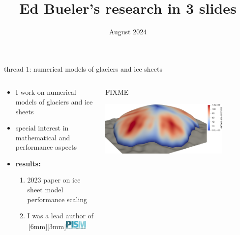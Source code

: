 \documentclass[svgnames,
               hyperref={colorlinks,citecolor=DeepPink4,linkcolor=FireBrick,urlcolor=Maroon},
               usepdftitle=false]  %
               {beamer}
\title{Ed Bueler's research in 3 slides}
\institute[]{Department of Mathematics \& Statistics \\ University of Alaska Fairbanks}
\date[]{\footnotesize August 2024}
\begin{document}
\addtocounter{framenumber}{-1}

\beamertemplatenavigationsymbolsempty

{
  \begin{frame}

\vspace{10mm}

    \titlepage
  \end{frame}
}


\begin{frame}{thread 1: numerical models of glaciers and ice sheets}

\begin{columns}
\begin{column}{0.45\textwidth}
\begin{itemize}
\item I work on {\color{FireBrick} numerical models of glaciers and ice sheets}
\item special interest in mathematical and performance aspects
\item \textbf{results:}
    \begin{enumerate}
    \item 2023 paper on ice sheet model performance scaling    
    \item I was a lead author of \,\raisebox{-5pt}[6mm][3mm]{\href{https://www.pism.io/}{\includegraphics[width=0.3\textwidth]{figs/pism.png}}}
    \end{enumerate}

\end{itemize}
\end{column}
\begin{column}{0.55\textwidth}
\hfill FIXME

\vspace{5mm}
\hfill \includegraphics[width=0.8\textwidth]{figs/sialev8scene.png}


\end{column}
\end{columns}
\end{frame}
\end{document}
